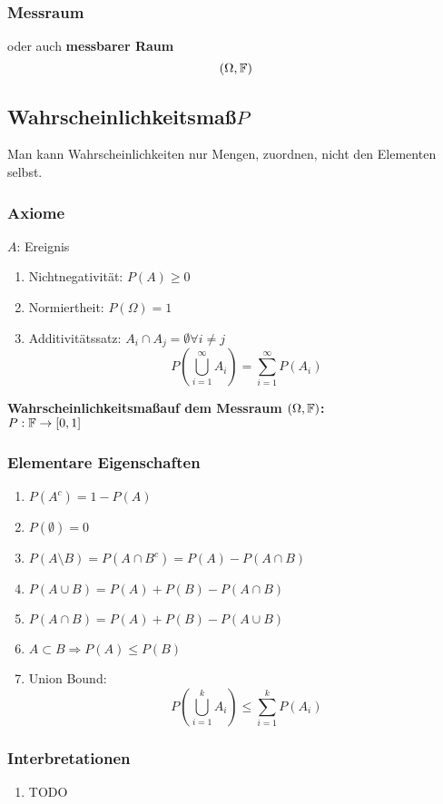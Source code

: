 \documentclass[german]{latex4ei/latex4ei_sheet}
\begin{document}
\subsubsection{Messraum}
oder auch \textbf{messbarer Raum}\\
\[(\Omega,\operatorname{\mathbb F})\]

\subsection{Wahrscheinlichkeitsma\ss{}$P$}
Man kann Wahrscheinlichkeiten nur Mengen, zuordnen, nicht den Elementen selbst.
\subsubsection{Axiome}
$A$: Ereignis
\begin{enumerate}
	\item Nichtnegativit\"at: $P(A)\ge 0$
	\item Normiertheit: $P(\Omega)=1$
	\item Additivit\"atssatz: $A_i \cap A_j=\emptyset \forall i \neq j$
		\[P(\bigcup\limits_{i=1}^\infty A_i)=\sum_{i=1}^\infty P(A_i)\]
\end{enumerate}
\textbf{Wahrscheinlichkeitsma\ss{}auf dem Messraum $(\Omega,\operatorname{\mathbb F})$:}\\
$P: \operatorname{\mathbb F} \to [0,1]$\\
\subsubsection{Elementare Eigenschaften}
\begin{enumerate}
	\item $P(A^c)=1-P(A)$
	\item $P(\emptyset)=0$
	\item $P(A \setminus B)=P(A \cap B^c)=P(A)-P(A\cap B)$
	\item $P(A \cup B)=P(A)+P(B)-P(A\cap B)$
	\item $P(A \cap B)=P(A)+P(B)-P(A \cup B)$
	\item $A \subset B \Rightarrow P(A) \le P(B)$
	\item Union Bound:\\
		\[P(\bigcup\limits_{i=1}^k A_i) \le \sum_{i=1}^k P(A_i)\]
\end{enumerate}
\subsubsection{Interbretationen}
\begin{enumerate}
	\item TODO
\end{enumerate}
\end{document}
